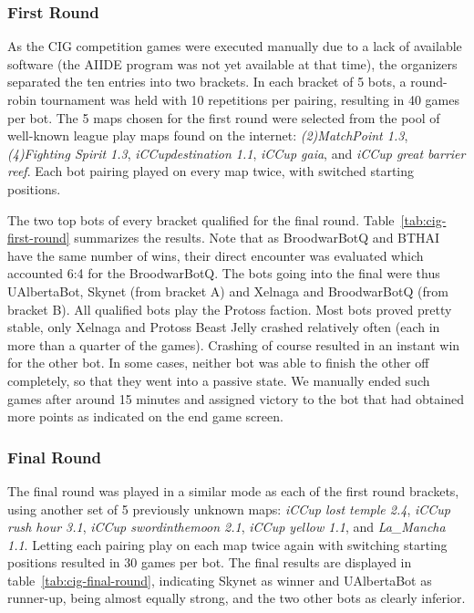 \documentclass[journal]{IEEEtran}
\begin{document}
\subsubsection{First Round}
\label{sec:cig-first-round}

As the CIG competition games were executed manually due to
a lack of available software (the AIIDE program was not yet
available at that time), the organizers separated the ten entries into
two brackets. In each bracket of 5 bots, a round-robin
tournament was held with 10 repetitions per pairing, resulting
in 40 games per bot.
The 5 maps chosen for the first round were selected from the pool
of well-known league play maps found on the internet:
\emph{(2)MatchPoint 1.3}, \emph{(4)Fighting Spirit 1.3}, 
\emph{iCCupdestination 1.1}, \emph{iCCup gaia}, and 
\emph{iCCup great barrier reef}. Each bot pairing played
on every map twice, with switched starting positions.

The two top bots of every bracket qualified
for the final round. Table~\ref{tab:cig-first-round} summarizes
the results.
Note that as BroodwarBotQ and BTHAI have the same number of wins,
their direct encounter was evaluated which accounted 6:4 for the BroodwarBotQ.
The bots going into the final were thus UAlbertaBot, Skynet (from bracket A)
and Xelnaga and BroodwarBotQ (from bracket B). All qualified bots play the
Protoss faction. Most bots proved pretty stable, only Xelnaga and Protoss 
Beast Jelly crashed relatively often (each in more than a quarter of the games). 
Crashing of course resulted in an instant win for the other bot.
In some cases, neither bot was able to finish the other off completely,
so that they went into a passive state. We manually ended such games after
around 15 minutes and assigned victory to the bot that had obtained more
points as indicated on the end game screen.


\subsubsection{Final Round}
\label{sec:cig-final-round}

The final round was played in a similar mode as each of the
first round brackets,
using another set of 5 previously unknown maps:
\emph{iCCup lost temple 2.4}, \emph{iCCup rush hour 3.1},
\emph{iCCup swordinthemoon 2.1}, \emph{iCCup yellow 1.1},
and \emph{La\_Mancha 1.1}. 
Letting each pairing play on each map twice again with
switching starting positions resulted in 30 games per bot.
The final results are displayed in table~\ref{tab:cig-final-round},
indicating Skynet as winner and UAlbertaBot as runner-up, being
almost equally strong, and the two other bots as clearly inferior.
\end{document}
